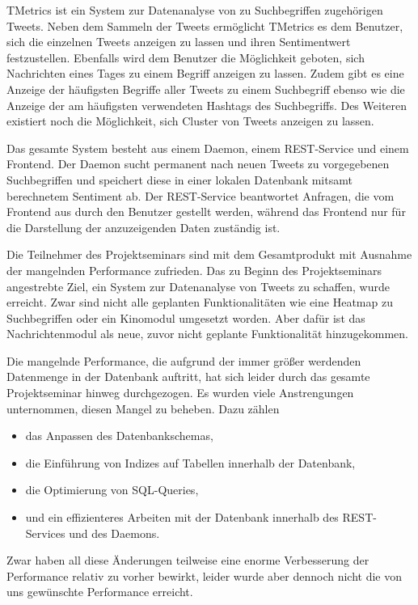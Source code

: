 \label{sec:ausblick}
TMetrics ist ein System zur Datenanalyse von zu Suchbegriffen zugehörigen Tweets.
Neben dem Sammeln der Tweets ermöglicht TMetrics es dem Benutzer, sich die einzelnen Tweets 
anzeigen zu lassen und ihren Sentimentwert festzustellen.
Ebenfalls wird dem Benutzer die Möglichkeit geboten, sich Nachrichten eines Tages zu einem 
Begriff anzeigen zu lassen.
Zudem gibt es eine Anzeige der häufigsten Begriffe aller Tweets zu einem Suchbegriff ebenso 
wie die Anzeige der am häufigsten verwendeten Hashtags des Suchbegriffs.
Des Weiteren existiert noch die Möglichkeit, sich Cluster von Tweets anzeigen zu lassen.

Das gesamte System besteht aus einem Daemon, einem REST-Service und einem Frontend.
Der Daemon sucht permanent nach neuen Tweets zu vorgegebenen Suchbegriffen und speichert diese in einer lokalen Datenbank mitsamt berechnetem Sentiment ab. 
Der REST-Service beantwortet Anfragen, die vom Frontend aus durch den Benutzer gestellt werden, während das Frontend nur für die Darstellung der anzuzeigenden Daten zuständig ist.

Die Teilnehmer des Projektseminars sind mit dem Gesamtprodukt mit Ausnahme der mangelnden 
Performance zufrieden.
Das zu Beginn des Projektseminars angestrebte Ziel, ein System zur Datenanalyse von Tweets 
zu schaffen, wurde erreicht.
Zwar sind nicht alle geplanten Funktionalitäten wie eine Heatmap zu Suchbegriffen oder ein Kinomodul umgesetzt worden.
Aber dafür ist das Nachrichtenmodul als neue, zuvor nicht geplante Funktionalität hinzugekommen.

Die mangelnde Performance, die aufgrund der immer größer werdenden Datenmenge in der Datenbank auftritt, hat sich leider durch das gesamte Projektseminar hinweg durchgezogen. Es wurden viele Anstrengungen unternommen, diesen Mangel zu beheben. Dazu zählen
\begin{itemize}
\item das Anpassen des Datenbankschemas,
\item die Einführung von Indizes auf Tabellen innerhalb der Datenbank,
\item die Optimierung von SQL-Queries,
\item und ein effizienteres Arbeiten mit der Datenbank innerhalb des REST-Services und des Daemons.
\end{itemize}
Zwar haben all diese Änderungen teilweise eine enorme Verbesserung der Performance relativ zu vorher bewirkt, leider wurde aber dennoch nicht die von uns gewünschte Performance erreicht.


